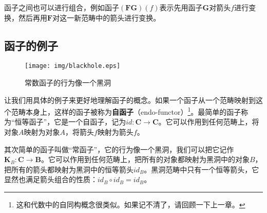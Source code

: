 \documentclass{article}
\begin{document}
函子之间也可以进行组合，例如函子$(\mathbf{F} \mathbf{G})(f)$表示先用函子$\mathbf{G}$对箭头$f$进行变换，然后再用$\mathbf{F}$对这一新范畴中的箭头进行变换。

\subsection{函子的例子}
\label{sec:functor:examples}

\begin{wrapfigure}{R}{0.3\textwidth}
 \centering
 \texttt{[image: img/blackhole.eps]}
 \captionsetup{labelformat=empty}
 \caption{常数函子的行为像一个黑洞}
 \label{fig:blackhole}
\end{wrapfigure}

 
让我们用具体的例子来更好地理解函子的概念。如果一个函子从一个范畴映射到这个范畴本身上，这样的函子被称为\textbf{自函子}（endo-functor）\footnote{这和代数中的自同构概念很类似。如果记不清了，请回顾一下上一章。}。最简单的函子称为“恒等函子”，它是一个自函子，记为$id: \pmb{C} \to \pmb{C}$。它可以作用到任何范畴上，将对象$A$映射为对象$A$，将箭头$f$映射为箭头$f$。

其次简单的函子叫做“常函子”，它的行为像一个黑洞，我们可以把它记作$\mathbf{K}_B : \pmb{C} \to \pmb{B}$。它可以作用到任何范畴上，把所有的对象都映射为黑洞中的对象$B$，把所有的箭头都映射为黑洞中的恒等箭头$id_B$。黑洞范畴中只有一个恒等箭头，它显然也满足箭头组合的性质：$id_B \circ id_B = id_B$。
\end{document}
